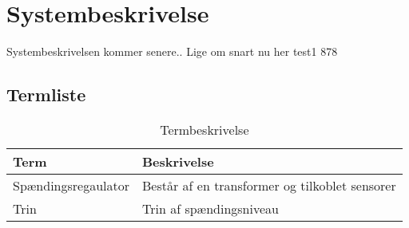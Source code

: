 
\section{Systembeskrivelse}

Systembeskrivelsen kommer senere.. Lige om snart nu her test1 878

\subsection{Termliste}

\begin{table}[htbp]
\centering
\begin{tabular}{|l|l|}
\hline
\textbf{Term} 	& \textbf{Beskrivelse} \\\hline
Spændingsregaulator	& Består af en transformer og tilkoblet sensorer \\\hline
Trin 	& Trin af spændingsniveau \\\hline

\end{tabular}
\caption{Termbeskrivelse}
\label{tab:termbeskrivelsen}

\end{table}